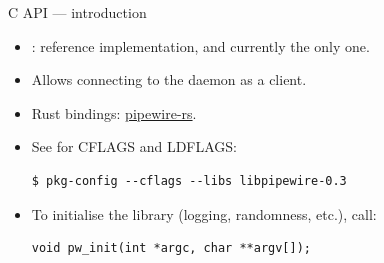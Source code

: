 \begin{frame}[fragile]{C API — introduction}
  \begin{itemize}

  \item {}: reference implementation, and currently the only one.

  \item Allows connecting to the daemon as a client.

  \item Rust bindings: \href{
    https://gitlab.freedesktop.org/pipewire/pipewire-rs}{pipewire-rs}.

  \item See  for CFLAGS and LDFLAGS:

    \begin{verbatim}
$ pkg-config --cflags --libs libpipewire-0.3
    \end{verbatim}

  \item To initialise the library (logging, randomness, etc.), call:
    \begin{verbatim}
void pw_init(int *argc, char **argv[]);
    \end{verbatim}

  \end{itemize}
\end{frame}



